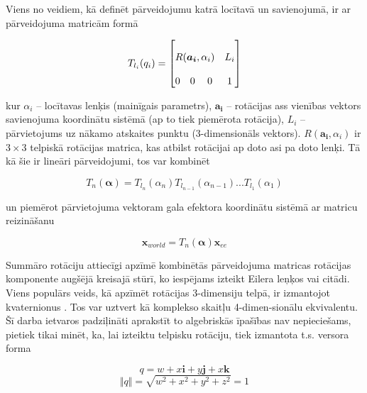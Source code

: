 \documentclass[12pt, a4paper]{article}
\numberwithin{equation}{section} %
\begin{document}
Viens no veidiem, kā definēt pārveidojumu katrā locītavā un savienojumā, ir ar pārveidojuma matricām formā

\begin{equation}
    T_{l_i}(q_i) =
    \begin{bmatrix}
        \multicolumn{3}{c}{\multirow{3}{*}{$R(\boldsymbol{a_i},\alpha_i)$}} & \multirow{3}{*}{$L_i$} \\
        \multicolumn{3}{c}{} & \multirow{3}{*}{} \\
        \multicolumn{3}{c}{} & \multirow{3}{*}{} \\
        0 & 0 & 0 & 1
    \end{bmatrix}
\end{equation}

kur $\alpha_i$ -- locītavas lenķis (mainīgais parametrs), $\boldsymbol{a_i}$ -- rotācijas ass vienības vektors savienojuma koordinātu sistēmā (ap to tiek piemērota rotācija), $L_i$ -- pārvietojums uz nākamo atskaites punktu (3-dimensionāls vektors). $R(\boldsymbol{a_i},\alpha_i)$ ir $3 \times 3$ telpiskā rotācijas matrica, kas atbilst rotācijai ap doto asi pa doto lenķi. Tā kā šie ir lineāri pārveidojumi, tos var kombinēt

\begin{equation}
    T_{n}(\boldsymbol{\alpha}) = T_{l_n}(\alpha_n)T_{l_{n-1}}(\alpha_{n-1})...T_{l_{1}}(\alpha_{1})
\end{equation}

un piemērot pārvietojuma vektoram gala efektora koordinātu sistēmā ar matricu reizināšanu

\begin{equation}
    \boldsymbol{x}_{world} = T_{n}(\boldsymbol{\alpha})\boldsymbol{x}_{ee}
\end{equation}

Summāro rotāciju attiecīgi apzīmē kombinētās pārveidojuma matricas rotācijas \newline komponente augšējā kreisajā stūrī, ko iespējams izteikt Eilera leņķos vai citādi. Viens populārs veids, kā apzīmēt rotācijas 3-dimensiju telpā, ir izmantojot kvaternionus \cite{quaternions_illinois}. Tos var uztvert kā komplekso skaitļu 4-dimen-sionālu ekvivalentu. Šī darba ietvaros padziļināti aprakstīt to algebriskās īpašības nav nepieciešams, pietiek tikai minēt, ka, lai izteiktu telpisku rotāciju, tiek izmantota t.s. versora forma

\begin{equation}
    q = w + x\boldsymbol{i} + y\boldsymbol{j} + x\boldsymbol{k}
\end{equation}
\begin{equation}
    \Vert q \Vert = \sqrt{w^2 + x^2 + y^2 + z^2} = 1
\end{equation}
\end{document}

